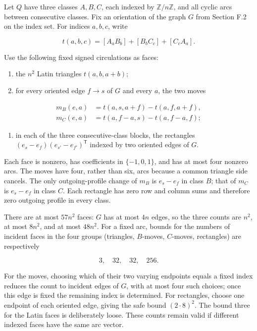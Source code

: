 \documentclass[english,11pt,a4paper]{article}
\providecommand{\tightlist}{\setlength{\itemsep}{0pt}\setlength{\parskip}{0pt}}
\begin{document}
Let \(Q\) have three classes \(A,B,C\), each indexed by \(\mathbb Z/n\mathbb Z\), and all cyclic arcs between consecutive classes. Fix an orientation of the graph \(G\) from Section F.2 on the index set. For indices \(a,b,c\), write

\[t(a,b,c)=[A_aB_b]+[B_bC_c]+[C_cA_a].\]

Use the following fixed signed circulations as faces:

\begin{enumerate}
\def\labelenumi{\arabic{enumi}.}
\tightlist
\item
  the \(n^{2}\) Latin triangles \(t(a,b,a+b)\);
\item
  for every oriented edge \(f\to s\) of \(G\) and every \(a\), the two moves
\end{enumerate}

\[\begin{aligned}m_B(e,a)&=t(a,s,a+f)-t(a,f,a+f),\\m_C(e,a)&=t(a,f-a,s)-t(a,f-a,f);\end{aligned}\]

\begin{enumerate}
\def\labelenumi{\arabic{enumi}.}
\setcounter{enumi}{2}
\tightlist
\item
  in each of the three consecutive-class blocks, the rectangles \((e_s-e_f)(e_{s\prime}-e_{f\prime})^{\mathsf T}\) indexed by two oriented edges of \(G\).
\end{enumerate}

Each face is nonzero, has coefficients in \(\{-1,0,1\}\), and has at most four nonzero arcs. The moves have four, rather than six, arcs because a common triangle side cancels. The only outgoing-profile change of \(m_{B}\) is \(e_{s}-e_{f}\) in class \(B\); that of \(m_{C}\) is \(e_{s}-e_{f}\) in class \(C\). Each rectangle has zero row and column sums and therefore zero outgoing profile in every class.

There are at most \(57n^{2}\) faces: \(G\) has at most \(4n\) edges, so the three counts are \(n^{2}\), at most \(8n^{2}\), and at most \(48n^{2}\). For a fixed arc, bounds for the numbers of incident faces in the four groups (triangles, \(B\)-moves, \(C\)-moves, rectangles) are respectively

\[3,\quad32,\quad32,\quad256.\tag{F.4}\]

For the moves, choosing which of their two varying endpoints equals a fixed index reduces the count to incident edges of \(G\), with at most four such choices; once this edge is fixed the remaining index is determined. For rectangles, choose one endpoint of each oriented edge, giving the safe bound \((2\cdot 8)^{2}\). The bound three for the Latin faces is deliberately loose. These counts remain valid if different indexed faces have the same arc vector.
\end{document}
